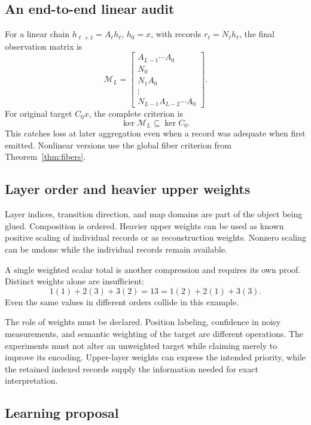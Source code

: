 \subsection{An end-to-end linear audit}

For a linear chain \(h_{\ell+1}=A_\ell h_\ell\), \(h_0=x\), with records
\(r_\ell=N_\ell h_\ell\), the final observation matrix is
\begin{equation}
 \mathcal M_L=
 \begin{bmatrix}
 A_{L-1}\cdots A_0\\
 N_0\\
 N_1A_0\\
 \vdots\\
 N_{L-1}A_{L-2}\cdots A_0
 \end{bmatrix}.
 \label{eq:chain}
\end{equation}
For original target \(C_0x\), the complete criterion is
\[
 \ker\mathcal M_L\subseteq\ker C_0.
\]
This catches loss at later aggregation even when a record was adequate when
first emitted. Nonlinear versions use the global fiber criterion from
Theorem~\ref{thm:fibers}.

\subsection{Layer order and heavier upper weights}

Layer indices, transition direction, and map domains are part of the object
being glued. Composition is ordered. Heavier upper weights can be used as
known positive scaling of individual records or as reconstruction weights.
Nonzero scaling can be undone while the individual records remain available.

A single weighted scalar total is another compression and requires its own
proof. Distinct weights alone are insufficient:
\[
 1(1)+2(3)+3(2)=13=1(2)+2(1)+3(3).
\]
Even the same values in different orders collide in this example.

The role of weights must be declared. Position labeling, confidence in noisy
measurements, and semantic weighting of the target are different operations.
The experiments must not alter an unweighted target while claiming merely
to improve its encoding. Upper-layer weights can express the intended
priority, while the retained indexed records supply the information needed
for exact interpretation.

\subsection{Learning proposal}

